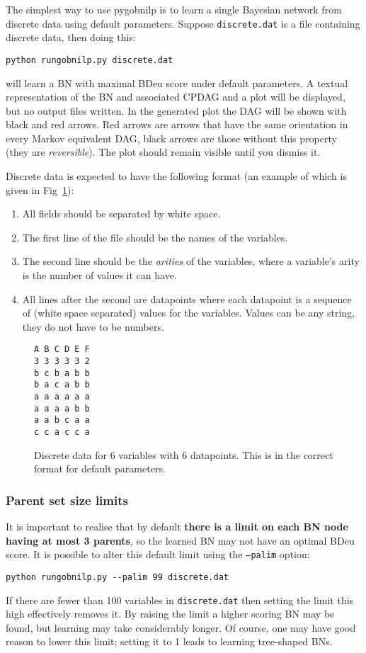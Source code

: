 \documentclass{article}
\newcommand{\pygobnilp}{\textsf{pygobnilp}}
\begin{document}
The simplest way to use \pygobnilp{} is to learn a single Bayesian
network from discrete data using default parameters. Suppose
\texttt{discrete.dat} is a file containing discrete data, then doing this:
\begin{verbatim}
python rungobnilp.py discrete.dat 
\end{verbatim}
will learn a BN with maximal BDeu score under default parameters. A
textual representation of the BN and associated CPDAG and a plot will
be displayed, but no output files written. In the generated plot the
DAG will be shown with black and red arrows. Red arrows are arrows
that have the same orientation in every Markov equivalent DAG, black
arrows are those without this property (they are
\emph{reversible}). The plot should remain visible until you dismiss
it.

Discrete data is expected to have the following format (an example of
which is given in Fig~\ref{fig:discretedat}):
\begin{enumerate}
\item All fields should be separated by white space.
\item The first line of the file should be the names of the
  variables.
\item The second line should be the \emph{arities} of the variables,
  where a variable's arity is the number of values it can have.
\item All lines after the second are datapoints where each datapoint
  is a sequence of (white space separated) values for the
  variables. Values can be any string, they do not have to be numbers.
\end{enumerate}

\begin{figure}
  \centering
\begin{verbatim}
A B C D E F
3 3 3 3 3 2
b c b a b b
b a c a b b
a a a a a a
a a a a b b
a a b c a a
c c a c c a
\end{verbatim}
  \caption{Discrete data for 6 variables with 6 datapoints. This is in
  the correct format for default parameters.}
  \label{fig:discretedat}
\end{figure}

\subsubsection{Parent set size limits}
\label{sec:palim}



It is important to realise that by default \textbf{there is a limit on
each BN node having at most 3 parents}, so the learned BN may not have
an optimal BDeu score. It is possible to alter this default limit
using the \texttt{--palim} option:
\begin{verbatim}
python rungobnilp.py --palim 99 discrete.dat 
\end{verbatim}
If there are fewer than 100 variables in \texttt{discrete.dat} then
setting the limit this high effectively removes it. By raising the
limit a higher scoring BN may be found, but learning may take
considerably longer. Of course, one may have good reason to lower this
limit; setting it to 1 leads to learning tree-shaped BNs.
\end{document}
